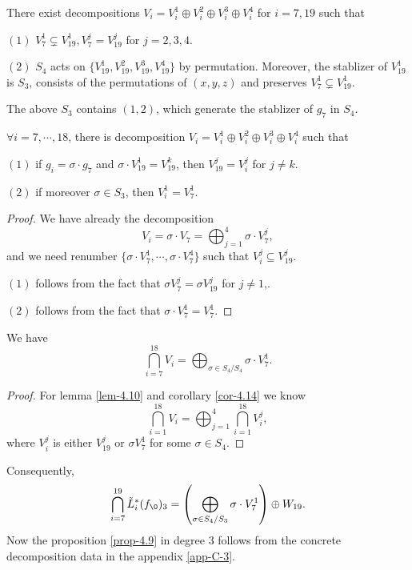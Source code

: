 \begin{fact}\label{fac-4.13}
  There exist decompositions
  $V_i=V_i^1\oplus V_i^2\oplus V_i^3 \oplus V_i^4$
  for $i=7,19$ such that
\item[$(1)$]$V_7^1\subsetneq V_{19}^1,  V_7^j=V_{19}^j $ for $j=2,3,4$.
\item[$(2)$] $S_4$ acts on $\{V_{19}^1, V_{19}^2, V_{19}^3, V_{19}^4\}$ by permutation. Moreover, the stablizer of $V_{19}^1$ is $S_3$, consists of the permutations of $(x,y,z)$ and preserves $V_7^1\subsetneq V_{19}^1$. 
\end{fact}
\begin{remark}
  The above $S_3$ contains $(1,2)$, which generate the stablizer of $g_7$ in $S_4$.
\end{remark}
\begin{corollary}\label{cor-4.14}
  $\forall i =7,\cdots, 18$, there is decomposition $V_i=V_i^1\oplus V_i^2\oplus V_i^3 \oplus V_i^4$ such that
\item[$(1)$] if $g_i=\sigma\cdot g_7$ and $\sigma\cdot V_{19}^1 = V_{19}^k$, then $V_{19}^j= V_i^j$ for $j\not=k$. 
\item[$(2)$] if moreover $\sigma \in S_3$, then $V_i^1=V_7^1$.
\end{corollary}
\begin{proof}
  We have already the decomposition
  \[V_i=\sigma \cdot V_7 = \bigoplus_{j=1}^4\sigma \cdot V_7^j,\]
  and we need renumber $\{\sigma\cdot V_7^1,\cdots, \sigma \cdot V_7^4\}$ such that $V_i^j \subseteq V_{19}^j.$
\item[$(1)$] follows from the fact that $\sigma V_7^j=\sigma V_{19}^j$ for $j\not=1$,.
\item[$(2)$] follows from the fact that $\sigma\cdot V_7^1= V_7^1$.
\end{proof}
\begin{corollary}
  We have
  \[\bigcap_{i=7}^{18} V_i = \bigoplus_{\sigma \in S_4/S_4} \sigma\cdot V_7^1.\]
\end{corollary}
\begin{proof}
  For lemma \ref{lem-4.10}  and corollary \ref{cor-4.14} we know
  \[\bigcap_{i=1}^{18} V_i = \bigoplus_{j=1}^4 \bigcap_{i=1}^{18} V_i^j,\]
  where $V_i^j$ is either $V_{19}^j$ or $\sigma V_7^1$ for some $\sigma \in S_4$.
\end{proof}
Consequently, 
\[\bigcap_{i=7}^{19} \tilde L_i^*(f_\0)_3 = \left( \bigoplus_{\sigma \in S_4/S_3} \sigma\cdot V_7^1\right) \oplus W_{19}. \]
Now the proposition \ref{prop-4.9} in degree $3$ follows from the concrete decomposition data in the appendix \ref{app-C-3}.

